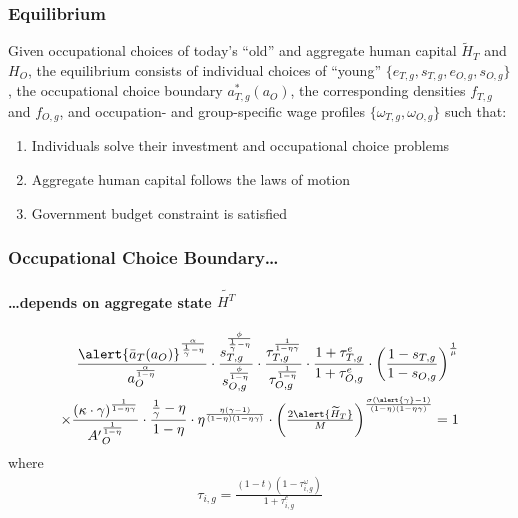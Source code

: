 \documentclass[11pt]{beamer}
\begin{document}
\begin{frame}
\frametitle{Equilibrium}
\label{eqm}
Given occupational choices of today's ``old'' and aggregate human capital $\widetilde{H}_{T}$ and ${H}_{O}$, the equilibrium consists of individual choices of ``young'' $\{e_{T,g}, s_{T,g}, e_{O,g}, s_{O,g}\}$, the occupational choice boundary $a^*_{T,g}(a_O)$, the corresponding densities $f_{T,g}$ and $f_{O,g}$, and occupation- and group-specific wage profiles $\{\omega_{T,g}, \omega_{O,g}\}$ such that:
\begin{enumerate}
	\item Individuals solve their investment and occupational choice problems \hyperlink{time_inv}{} \hyperlink{good_inv}{}
	\item Aggregate human capital follows the laws of motion \hyperlink{laws}{}
	\item Government budget constraint is satisfied \hyperlink{tax}{} 
\end{enumerate}
\end{frame}

\begin{frame}
\frametitle{Occupational Choice Boundary\ldots}
\framesubtitle{\ldots depends on aggregate state $\widetilde{H^T}$} 
\begin{align*}
	\frac{\alert{\bar{a}_T(a_O)}^\frac{\alpha}{\frac{1}{\gamma}-\eta}}{a_O^\frac{\alpha}{1-\eta}} \cdot \frac{s_{T,g}^\frac{\phi}{\frac{1}{\gamma}-\eta}}{s_{O,g}^\frac{\phi}{1-\eta}}\cdot \frac{\tau_{T,g}^\frac{1}{1-\eta\gamma}}{\tau_{O,g}^\frac{1}{1-\eta}} \cdot \frac{1+\tau^e_{T,g}}{1+\tau^e_{O,g}}\cdot \left(\frac{1-s_{T,g}}{1-s_{O,g}}\right)^\frac{1}{\mu} \nonumber\\
	\times \frac{\left(\kappa \cdot \gamma\right)^\frac{1}{1-\eta\gamma}}{{A'}_O^\frac{1}{1-\eta}} \cdot \frac{\frac{1}{\gamma}-\eta}{1-\eta}\cdot \eta^\frac{\eta(\gamma-1)}{(1-\eta)(1-\eta\gamma)} \cdot \left(\tfrac{2\alert{\widetilde{H}_T}}{M}\right)^{\frac{\sigma(\alert{\gamma}-1)}{(1-\eta)(1-\eta\gamma)}}=1 \nonumber
\end{align*}
where
\begin{align}
	\tau_{i,g} =\frac{(1-t)(1-\tau^{\omega}_{i,g})}{1+\tau^e_{i,g}} \nonumber
\end{align}
\end{frame}
\end{document}
